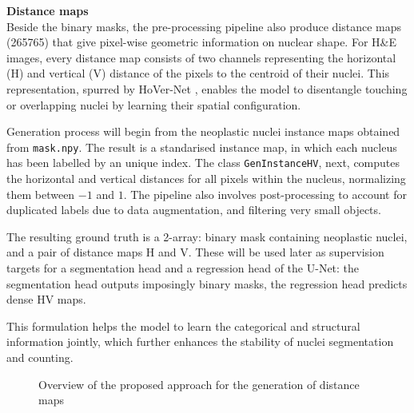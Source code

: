 \documentclass[target=bach,aauheader=,style=]{thud}
\begin{document}
\noindent\textbf{Distance maps}\\
Beside the binary masks, the pre-processing pipeline also produce distance maps (265765) that give pixel-wise geometric information on nuclear shape. For H\&E images, every distance map consists of two channels representing the horizontal (H) and vertical (V) distance of the pixels to the centroid of their nuclei. This representation, spurred by HoVer-Net \cite{graham2019hovernet}, enables the model to disentangle touching or overlapping nuclei by learning their spatial configuration.

Generation process will begin from the neoplastic nuclei instance maps obtained from \texttt{mask.npy}. The result is a standarised instance map, in which each nucleus has been labelled by an unique index. The class \texttt{GenInstanceHV}, next, computes the horizontal and vertical distances for all pixels within the nucleus, normalizing them between $-1$ and $1$. The pipeline also involves post-processing to account for duplicated labels due to data augmentation, and filtering very small objects.

The resulting ground truth is a 2-array: binary mask containing neoplastic nuclei, and a pair of distance maps H and V. These will be used later as supervision targets for a segmentation head and a regression head of the U-Net: the segmentation head outputs imposingly binary masks, the regression head predicts dense HV maps.

This formulation helps the model to learn the categorical and structural information jointly, which further enhances the stability of nuclei segmentation and counting.
\begin{figure}[htbp] %
\centering
{}
\caption{Overview of the proposed approach for the generation of distance maps}
\label{fig:esempio}
\end{figure}
\end{document}
